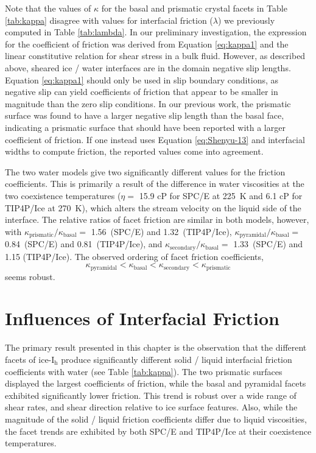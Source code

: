 Note that the values of $\kappa$ for the basal and prismatic crystal
facets in Table \ref{tab:kappa} disagree with values for interfacial
friction ($\lambda$) we previously computed in Table
\ref{tab:lambda}. In our preliminary investigation, the expression for
the coefficient of friction was derived from Equation
\eqref{eq:kappa1} and the linear constitutive relation for shear
stress in a bulk fluid.  However, as described above, sheared ice /
water interfaces are in the domain negative slip lengths. Equation
\eqref{eq:kappa1} should only be used in slip boundary conditions, as
negative slip can yield coefficients of friction that appear to be
smaller in magnitude than the zero slip conditions. In our previous
work, the prismatic surface was found to have a larger negative slip
length than the basal face, indicating a prismatic surface that should
have been reported with a larger coefficient of friction. If one
instead uses Equation \eqref{eq:Shenyu-13} and interfacial widths to
compute friction, the reported values come into agreement.

The two water models give two significantly different values for the
friction coefficients. This is primarily a result of the difference in
water viscosities at the two coexistence temperatures ($\eta = $ 15.9
cP for SPC/E at 225~K and 6.1 cP for TIP4P/Ice at 270~K), which alters
the stream velocity on the liquid side of the interface. The relative
ratios of facet friction are similar in both models, however, with
$\kappa_\mathrm{prismatic} / \kappa_\mathrm{basal} =$ 1.56~(SPC/E) and
1.32~(TIP4P/Ice),
$\kappa_\mathrm{pyramidal} / \kappa_\mathrm{basal} =$ 0.84~(SPC/E) and
0.81~(TIP4P/Ice), and
$\kappa_\mathrm{secondary} / \kappa_\mathrm{basal} =$ 1.33~(SPC/E) and
1.15 (TIP4P/Ice). The observed ordering of facet friction
coefficients,
\begin{equation}
\kappa_\mathrm{pyramidal} < \kappa_\mathrm{basal} <
\kappa_\mathrm{secondary} < \kappa_\mathrm{prismatic} 
\end{equation} 
seems robust.

 
\section{Influences of Interfacial Friction}
The primary result presented in this chapter is the observation that
the different facets of ice-I$_\mathrm{h}$ produce significantly
different solid / liquid interfacial friction coefficients with water
(see Table \ref{tab:kappa}).  The two prismatic surfaces displayed the
largest coefficients of friction, while the basal and pyramidal facets
exhibited significantly lower friction. This trend is robust over a
wide range of shear rates, and shear direction relative to ice surface
features. Also, while the magnitude of the solid / liquid friction
coefficients differ due to liquid viscosities, the facet trends are
exhibited by both SPC/E and TIP4P/Ice at their coexistence
temperatures.

